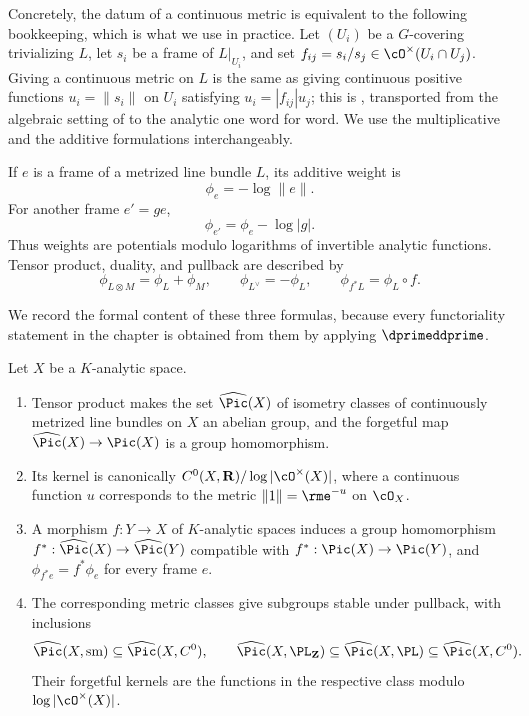 Concretely, the datum of a continuous metric is equivalent to the following
bookkeeping, which is what we use in practice.  Let $(U_i)$ be a
$G$-covering trivializing $L$, let $s_i$ be a frame of $L|_{U_i}$,
and set $f_{ij}=s_i/s_j\in\cO^\times(U_i\cap U_j)$.  Giving a continuous
metric on $L$ is the same as giving continuous positive functions
$u_i=\|s_i\|$ on $U_i$ satisfying $u_i=|f_{ij}|u_j$; this is
, transported from the algebraic setting of
 to the analytic one word for word.  We use the
multiplicative and the additive formulations interchangeably.

If $e$ is a frame of a metrized line bundle $L$, its additive weight is
\[
                         \phi_e=-\log\|e\|.
\]
For another frame $e'=ge$,
\begin{equation}
                    \phi_{e'}=\phi_e-\log|g|.
\label{eq:cld-weight-change-frame}
\end{equation}
Thus weights are potentials modulo logarithms of invertible analytic
functions.  Tensor product, duality, and pullback are described by
\[
 \phi_{L\otimes M} =\phi_L+\phi_M,\qquad
 \phi_{L^\vee}=-\phi_L,\qquad
 \phi_{f^*L}=\phi_L\circ f.
\]

We record the formal content of these three formulas, because every
functoriality statement in the chapter is obtained from them by applying
$\dprimeddprime$.

\begin{proposition}
\label{prop:ch17-metric-picard}
Let $X$ be a $K$-analytic space.
\begin{enumerate}
\item\label{itm:ch17-pic:group}
 Tensor product makes the set $\widehat{\Pic}(X)$ of isometry classes of
 continuously metrized line bundles on $X$ an abelian group, and the
 forgetful map $\widehat{\Pic}(X)\to\Pic(X)$ is a group homomorphism.
\item\label{itm:ch17-pic:kernel}
 Its kernel is canonically
 $C^0(X,\mathbf R)/\log|\cO^\times(X)|$, where a continuous function
 $u$ corresponds to the metric $\|1\|=\rme^{-u}$ on $\cO_X$.
\item\label{itm:ch17-pic:pullback}
 A morphism $f:Y\to X$ of $K$-analytic spaces induces a group
 homomorphism $f^*:\widehat{\Pic}(X)\to\widehat{\Pic}(Y)$ compatible with
 $f^*:\Pic(X)\to\Pic(Y)$, and $\phi_{f^*e}=f^*\phi_e$ for every frame
 $e$.
\item\label{itm:ch17-pic:sub}
 The corresponding metric classes give subgroups stable under pullback,
 with inclusions
 \[
 \widehat{\Pic}(X,\text{sm})\subseteq\widehat{\Pic}(X,C^0),
 \qquad
 \widehat{\Pic}(X,\PL_{\mathbf Z})\subseteq
 \widehat{\Pic}(X,\PL)\subseteq\widehat{\Pic}(X,C^0).
 \]
 Their forgetful kernels are the functions in the respective class
 modulo $\log|\cO^\times(X)|$.
\end{enumerate}
\end{proposition}

